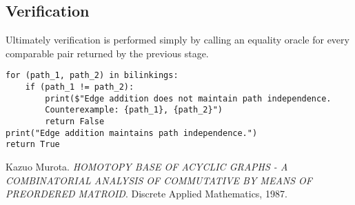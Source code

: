 \documentclass{article}
\begin{document}
\subsection{Verification}
Ultimately verification is performed simply by calling an equality oracle for every comparable pair returned by the previous stage.

\begin{verbatim}
for (path_1, path_2) in bilinkings:
    if (path_1 != path_2):
        print($"Edge addition does not maintain path independence. 
        Counterexample: {path_1}, {path_2}")
        return False
print("Edge addition maintains path independence.")
return True
\end{verbatim}


\begin{thebibliography}{9}
Kazuo Murota. 
\textit{HOMOTOPY BASE OF ACYCLIC GRAPHS - A COMBINATORIAL ANALYSIS OF COMMUTATIVE BY MEANS OF PREORDERED MATROID}. 
Discrete Applied Mathematics, 1987.

\end{thebibliography}
\end{document}
